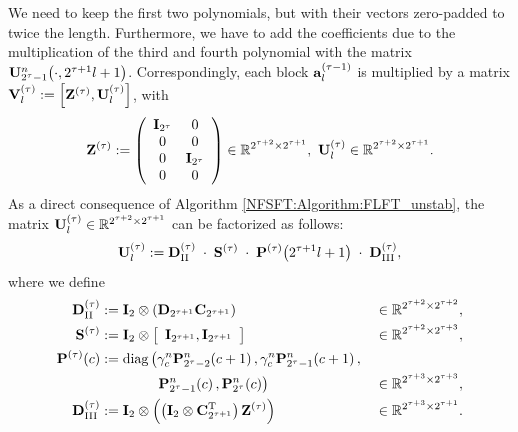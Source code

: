 We need to keep the first two polynomials, but with their vectors zero-padded to twice the length. Furthermore, we have to add 
the coefficients due to the multiplication of the third and fourth polynomial with the matrix $\mathbf{U}_{2^{\tau}-1}^{n}{\hspace{-0.4ex}}\left(\cdot,2^{\tau+1}l+1\right)$.
Correspondingly, each block $\mathbf{a}_{l}^{(\tau-1)}$ is multiplied by a matrix $\mathbf{V}^{(\tau)}_l := \left[\mathbf{Z^{(\tau)}},\mathbf{U}^{(\tau)}_l\right]$, with
\[\V{Z}^{(\tau)} := \left(\begin{array}{cccc} \V{I}_{2^{\tau}} & 0\\ 0 & 0 \\ 0 & \V{I}_{2^{\tau}} \\ 0 & 0 \end{array}\right) \in \R^{2^{\tau+2} \times 2^{\tau+1}},\ \V{U}^{(\tau)}_l \in \R^{2^{\tau+2} \times 2^{\tau+1}}.\]
As a direct consequence of Algorithm \ref{NFSFT:Algorithm:FLFT_unstab}, the matrix $\mathbf{U}^{(\tau)}_l \in \mathbb{R}^{2^{\tau+2} \times 2^{\tau+1}}$ can be factorized as follows:
\begin{equation} 
  \label{NFSFT:LinearAlgebra:Factorization}
  \mathbf{U}^{(\tau)}_l := \mathbf{D}^{(\tau)}_{\text{II}} \; \cdot \; \mathbf{S}^{(\tau)} \; \cdot \; \mathbf{P}^{(\tau)}{\hspace{-0.4ex}}\left(2^{\tau + 1}l+1\right) \; \cdot \; \mathbf{D}^{(\tau)}_{\text{III}},
\end{equation}
where we define
\begin{align*}
  \mathbf{D}^{(\tau)}_{\text{II}} & := \mathbf{I}_{2} \otimes \left(\mathbf{D}_{2^{\tau+1}} \mathbf{C}_{2^{\tau+1}}\right) & \in \mathbb{R}^{2^{\tau+2} \times 2^{\tau+2}},\\
  \mathbf{S}^{(\tau)} & := \mathbf{I}_2 \otimes \left[\begin{array}{cc}\mathbf{I}_{2^{\tau+1}},\mathbf{I}_{2^{\tau+1}}\end{array}\right] & \in \mathbb{R}^{2^{\tau+2} \times 2^{\tau+3}},\\
  \mathbf{P}^{(\tau)}{\hspace{-0.4ex}}\left(c\right) & := \text{diag}\left(\gamma_{c}^n \mathbf{P}_{2^{\tau}-2}^n{\hspace{-0.4ex}}\left(c+1\right),\gamma_{c}^n \mathbf{P}_{2^{\tau}-1}^n{\hspace{-0.4ex}}\left(c+1\right),\right.\\
    & \left. \hspace{9ex} \mathbf{P}_{2^{\tau}-1}^n{\hspace{-0.4ex}}\left(c\right), \mathbf{P}_{2^{\tau}}^n{\hspace{-0.4ex}}\left(c\right)\right) & \in \mathbb{R}^{2^{\tau+3} \times 2^{\tau+3}},\\
  \mathbf{D}^{(\tau)}_{\text{III}} & := \mathbf{I}_{2} \otimes \left(\left(\mathbf{I}_{2} \otimes \mathbf{C}^{\text{\rm{T}}}_{2^{\tau+1}}\right)\mathbf{Z}^{(\tau)}\right) & \in \mathbb{R}^{2^{\tau+3} \times 2^{\tau+1}}.
\end{align*}   
